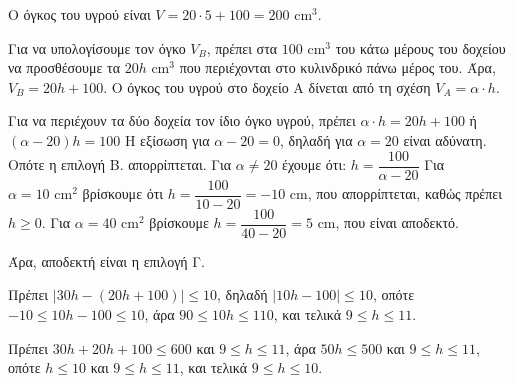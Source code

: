 
\begin{alist}
\item
\begin{rlist}
\item Ο όγκος του υγρού είναι $V = 20 \cdot 5 + 100 = 200 \text{ cm}^3$.
\item Για να υπολογίσουμε τον όγκο $V_B$, πρέπει στα $100 \text{ cm}^3$ του κάτω μέρους του δοχείου να προσθέσουμε τα $20h \text{ cm}^3$ που περιέχονται στο κυλινδρικό πάνω μέρος του. Άρα, $V_B = 20h + 100$.
Ο όγκος του υγρού στο δοχείο Α δίνεται από τη σχέση $V_A = \alpha \cdot h$.
\end{rlist}

\item Για να περιέχουν τα δύο δοχεία τον ίδιο όγκο υγρού, πρέπει
$\alpha \cdot h = 20h + 100$
ή
$(\alpha - 20)h = 100$
Η εξίσωση για $\alpha - 20 = 0$, δηλαδή για $\alpha = 20$ είναι αδύνατη. Οπότε η επιλογή Β. απορρίπτεται.
Για $\alpha \neq 20$ έχουμε ότι:
$h = \dfrac{100}{\alpha - 20}$
Για $\alpha = 10 \text{ cm}^2$ βρίσκουμε ότι $h = \dfrac{100}{10-20} = -10 \text{ cm}$, που απορρίπτεται, καθώς πρέπει $h \ge 0$.
Για $\alpha = 40 \text{ cm}^2$ βρίσκουμε $h = \dfrac{100}{40-20} = 5 \text{ cm}$, που είναι αποδεκτό.

Άρα, αποδεκτή είναι η επιλογή Γ.

\item
\begin{rlist}
\item Πρέπει $|30h - (20h + 100)| \le 10$,
δηλαδή $|10h - 100| \le 10$,
οπότε $-10 \le 10h - 100 \le 10$,
άρα $90 \le 10h \le 110$,
και τελικά $9 \le h \le 11$.
\item Πρέπει $30h + 20h + 100 \le 600$ και $9 \le h \le 11$,
άρα $50h \le 500$ και $9 \le h \le 11$,
οπότε $h \le 10$ και $9 \le h \le 11$,
και τελικά $9 \le h \le 10$.
\end{rlist}
\end{alist}

